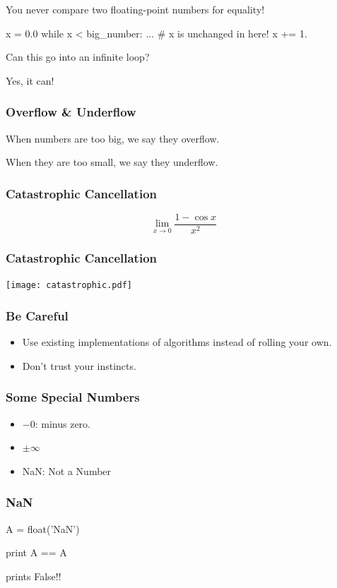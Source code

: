 \begin{frame}[fragile]
You never compare two floating-point numbers for equality!
\end{frame}

\begin{frame}[fragile]

\begin{python}
x = 0.0
while x < big_number:
    ... # x is unchanged in here!
    x += 1.
\end{python}

Can this go into an infinite loop?

\pause
Yes, it can!
\end{frame}

\begin{frame}[fragile]
\frametitle{Overflow \& Underflow}

When numbers are too big, we say they \alert{overflow}.

When they are too small, we say they \alert{underflow}.
\end{frame}


\begin{frame}[fragile]
\frametitle{Catastrophic Cancellation}

\[
\lim_{x \to 0} \frac{1-\cos x}{x^2}
\]
\end{frame}
\begin{frame}[fragile]
\frametitle{Catastrophic Cancellation}

\centering
\texttt{[image: catastrophic.pdf]}

\end{frame}

\begin{frame}[fragile]
\frametitle{Be Careful}

\begin{itemize}
\item Use existing implementations of algorithms instead of rolling your own.
\item Don't trust your instincts.
\end{itemize}
\end{frame}

\begin{frame}[fragile]
\frametitle{Some Special Numbers}

\begin{itemize}
\item $-0$: minus zero.
\item $\pm \infty$
\item NaN: Not a Number
\end{itemize}
\end{frame}

\begin{frame}[fragile]
\frametitle{NaN}
\begin{python}
A = float('NaN')

print A == A
\end{python}
prints \alert{False}!!

\end{frame}


